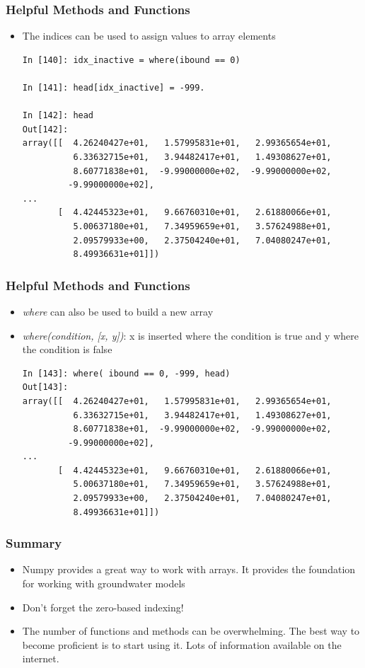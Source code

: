 \documentclass{beamer}
\begin{document}
\begin{frame}[fragile]
\frametitle{Helpful Methods and Functions}
  \begin{itemize}
    \item{The indices can be used to assign values to array elements}
    \begin{lstlisting}
In [140]: idx_inactive = where(ibound == 0)

In [141]: head[idx_inactive] = -999.

In [142]: head
Out[142]:
array([[  4.26240427e+01,   1.57995831e+01,   2.99365654e+01,
          6.33632715e+01,   3.94482417e+01,   1.49308627e+01,
          8.60771838e+01,  -9.99000000e+02,  -9.99000000e+02,
         -9.99000000e+02],
...
       [  4.42445323e+01,   9.66760310e+01,   2.61880066e+01,
          5.00637180e+01,   7.34959659e+01,   3.57624988e+01,
          2.09579933e+00,   2.37504240e+01,   7.04080247e+01,
          8.49936631e+01]])
    \end{lstlisting}
  \end{itemize}
\end{frame}

\begin{frame}[fragile]
\frametitle{Helpful Methods and Functions}
  \begin{itemize}
    \item{\emph{where} can also be used to build a new array}
    \item{\emph{where(condition, [x, y])}: x is inserted where the condition is true and y where the condition is false}
    \begin{lstlisting}
In [143]: where( ibound == 0, -999, head)
Out[143]:
array([[  4.26240427e+01,   1.57995831e+01,   2.99365654e+01,
          6.33632715e+01,   3.94482417e+01,   1.49308627e+01,
          8.60771838e+01,  -9.99000000e+02,  -9.99000000e+02,
         -9.99000000e+02],
...
       [  4.42445323e+01,   9.66760310e+01,   2.61880066e+01,
          5.00637180e+01,   7.34959659e+01,   3.57624988e+01,
          2.09579933e+00,   2.37504240e+01,   7.04080247e+01,
          8.49936631e+01]])
    \end{lstlisting}
  \end{itemize}
\end{frame}


\begin{frame}[fragile]
\frametitle{Summary}
\begin{itemize}
  \item{Numpy provides a great way to work with arrays.  It provides the foundation for working with groundwater models}
  \item{Don't forget the zero-based indexing!}
  \item{The number of functions and methods can be overwhelming.  The best way to become proficient is to start using it.  Lots of information available on the internet.}
\end{itemize}
\end{frame}
\end{document}
